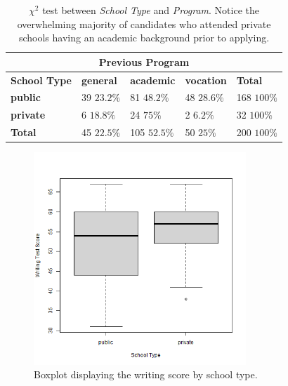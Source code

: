 \documentclass[10pt, a4paper]{article}
\begin{document}
	\begin{table}
		\centering
		\begin{tabular}
			{ |p{2cm} | p{1.2cm} p{1.2cm} p{1.2cm} | p{1.2cm} | }
			\hline
			\multicolumn{5}{|c|}{\textbf{Previous Program}}\\
			\hline
			\textbf{School Type} & \textbf{general} & \textbf{academic} & \textbf{vocation} & \textbf{Total}\\
			\hline
			\textbf{public} & \makecell{39 \\ $23.2\%$} & \makecell{81 \\ $48.2\%$} & \makecell{48 \\ $28.6\%$} & \makecell{168 \\ $100\%$} \\
			\textbf{private} & \makecell{6 \\ $18.8\%$} & \makecell{24 \\ $75\%$} & \makecell{2 \\ $6.2\%$} & \makecell{32 \\ $100\%$}\\
			\hline
			\textbf{Total} & \makecell{45 \\ $22.5\%$} & \makecell{105 \\ $52.5\%$} & \makecell{50 \\ $25\%$} & \makecell{200 \\ $100\%$}\\
			\hline
		\end{tabular}
		\caption{$\chi^2$ test between \textit{School Type} and \textit{Program}. Notice the overwhelming majority of candidates who attended private schools having an academic background prior to applying.}
		\label{tab::chisq}
	\end{table}
	
	\begin{figure}[h]
		\includegraphics[width=8cm]{write_schtyp_boxplot.png}
		\centering
		\caption{Boxplot displaying the writing score by school type.}
		\label{fig::write_schtyp_boxplot}
	\end{figure}
	
\end{document}
